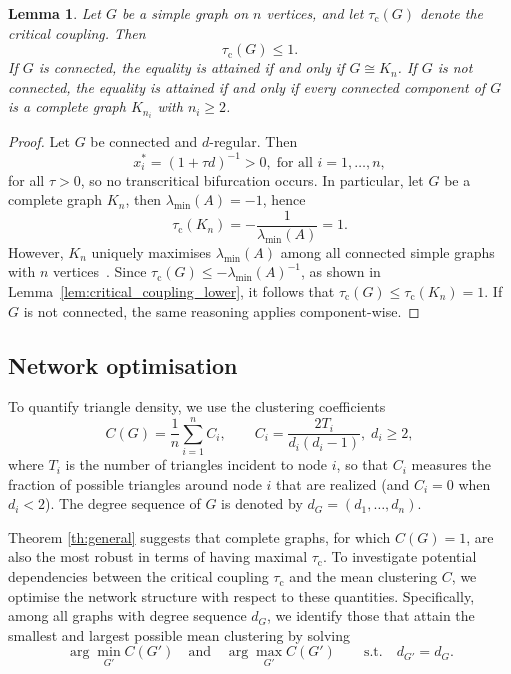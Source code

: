\documentclass[a4paper,12pt]{article}
\newtheorem{lemma}{Lemma}
\begin{document}
\begin{lemma}\label{lem:critical_coupling_upper}
    Let $G$ be a simple graph on $n$ vertices, and let $\tau_{\mathrm c}(G)$ denote the critical coupling. Then
    \begin{equation}
        \tau_{\mathrm c}(G) \le 1.
    \end{equation}
    If $G$ is connected, the equality is attained if and only if $G\cong K_n$.
    If $G$ is not connected, the equality is attained if and only if every connected component of $G$ is a complete graph $K_{n_i}$ with $n_i \ge 2$.    
\end{lemma}
\begin{proof}
    Let $G$ be connected and $d$-regular. Then
    \begin{equation*}
        x_i^* = (1 + \tau d)^{-1} > 0,\; \text{for all } i =1,\dots,n,
    \end{equation*}
    for all $\tau > 0$, so no transcritical bifurcation occurs. In particular, let $G$ be a complete graph $K_n$, then $\lambda_{\min}(A) = -1$, hence
    \begin{equation*}
        \tau_{\mathrm c}(K_n) =-\frac{1}{\lambda_{\min}(A)}= 1.
    \end{equation*}
    However, $K_{n}$ uniquely maximises $\lambda_{\min}(A)$ among all connected simple graphs with $n$ vertices~\cite{brouwer2012spectra}. 
    Since $\tau_{\mathrm{c}}(G) \le -\lambda_{\min}(A)^{-1}$, as shown in Lemma~\ref{lem:critical_coupling_lower}, it follows that $\tau_{\mathrm{c}}(G) \le \tau_{\mathrm{c}}(K_n) = 1$.
    If $G$ is not connected, the same reasoning applies component-wise.
\end{proof}


\subsection{Network optimisation}\label{sec:numerical}
To quantify triangle density, we use the clustering coefficients
\begin{equation}
    C(G)=\frac{1}{n}\sum_{i=1}^{n} C_i,
    \qquad
    C_i=\frac{2T_i}{d_i(d_i-1)}, \; d_i\ge 2,
\end{equation}
where $T_i$ is the number of triangles incident to node $i$, so that $C_i$ measures the fraction of possible triangles around node $i$ that are realized (and $C_i=0$ when $d_i<2$).
The degree sequence of $G$ is denoted by $d_G=(d_1,\dots,d_n)$.

Theorem \ref{th:general} suggests that complete graphs, for which $C(G)=1$, are also the most robust in terms of having maximal $\tau_{\mathrm{c}}$. 
To investigate potential dependencies between the critical coupling $\tau_{\mathrm{c}}$ and the mean clustering $C$, we optimise the network structure with respect to these quantities.
Specifically, among all graphs with degree sequence $d_G$, we identify those that attain the smallest and largest possible mean clustering by solving
\begin{equation}
    \arg\min_{G'} C(G')
    \quad\text{and}\quad
    \arg\max_{G'} C(G')
    \qquad\text{s.t.}\quad d_{G'}=d_G.
\end{equation}
\end{document}
